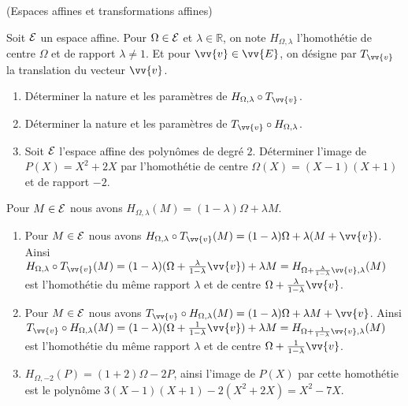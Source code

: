 \documentclass[a4paper,12pt,reqno]{amsart}
\begin{document}
\sisujet{\bigskip}
\begin{exo} (Espaces affines et transformations affines)

  Soit $\mathcal{E}$ un espace affine. Pour $\Omega \in \mathcal{E}$ et $\lambda \in \mathbb{R}$, on note $H_{\Omega,\lambda}$ l'homothétie de centre $\Omega$ et de rapport $\lambda \neq 1$. Et pour $\vv{v} \in \vv{E}$, on désigne par $T_{\vv{v}}$ la translation du vecteur $\vv{v}$.
  \begin{enumerate}
    \item Déterminer la nature et les paramètres de $H_{\Omega,\lambda}\circ T_{\vv{v}}$.
    \item Déterminer la nature et les paramètres de $T_{\vv{v}}\circ H_{\Omega,\lambda}$.
    \item Soit $\mathcal{E}$ l'espace affine des polynômes de degré $2$. Déterminer l'image de $P(X)=X^{2}+2X$ par l'homothétie de centre $\Omega(X) = (X-1)(X+1)$ et de rapport $-2$.
  \end{enumerate}

\end{exo}

\begin{solution}

  Pour $M \in  \mathcal{E}$ nous avons $H_{\Omega,\lambda}(M) = (1-\lambda)\Omega + \lambda M$.
  \begin{enumerate}
    \item Pour $M \in  \mathcal{E}$ nous avons $H_{\Omega,\lambda}\circ T_{\vv{v}}(M) = (1-\lambda)\Omega + \lambda (M+\vv{v})$. Ainsi $H_{\Omega,\lambda}\circ T_{\vv{v}}(M) = (1-\lambda)(\Omega + \frac{\lambda}{1-\lambda}\vv{v}) + \lambda M = H_{\Omega + \frac{\lambda}{1-\lambda}\vv{v},\lambda}(M)$ est l'homothétie du même rapport $\lambda$ et de centre $\Omega + \frac{\lambda}{1-\lambda}\vv{v}$.
    \item Pour $M \in  \mathcal{E}$ nous avons $T_{\vv{v}}\circ H_{\Omega,\lambda} (M) = (1-\lambda)\Omega + \lambda M+\vv{v}$. Ainsi $T_{\vv{v}} \circ H_{\Omega,\lambda}(M) = (1-\lambda)(\Omega + \frac{1}{1-\lambda}\vv{v}) + \lambda M = H_{\Omega + \frac{1}{1-\lambda}\vv{v},\lambda}(M)$ est l'homothétie du même rapport $\lambda$ et de centre $\Omega + \frac{1}{1-\lambda}\vv{v}$.
    \item $H_{\Omega,-2}(P) = (1+2)\Omega-2P$, ainsi l'image de $P(X)$ par cette homothétie est le polynôme $3(X-1)(X+1)-2(X^{2}+2X) = X^{2} -7X$.

  \end{enumerate}
\end{solution}
\end{document}
